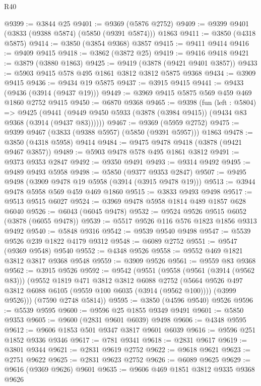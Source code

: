\begin{lexlean}{R40}
\begin{coremodule}
@9399 := @3844 @25
@9401 := @9369 (@5876 @2752)
@9409 := @9399 @9401 (@3833 (@9388 @5874) (@5850 (@9391 @5874))) @1863
@9411 := @3850 (@4318 @5875)
@9414 := @3850 (@3854 @9368) @3857
@9415 := @9411 @9414
@9416 := @9409 @9415
@9418 := @3862 (@3872 @25)
@9419 := @9416 @9418
@9421 := @3879 (@3880 @1863)
@9425 := @9419 (@3878 (@9421 @9401 @3857))
@9433 := @5903 @9415 @578 @495 @1861 @3812 @3812 @5875 @9368
@9434 := @3909 @9415
@9436 := @9434 @19 @5875
@9437 := @3915 @9415
@9441 := @9433 (@9436 (@3914 (@9437 @19)))
@9449 := @3969 @9415 @5875 @569 @459 @469 @1860 @2752 @9415
@9450 := @6870 @9368
@9465 := @9398
    (fun (left : @5804) =>
    @9425 (@9441 (@9449 @9450 @5933 (@3878 (@3984 @9415)) (@9434 @83 @9368 (@3914 (@9437 @83))))))
@9467 := @9369 (@5959 @2752)
@9475 := @9399 @9467 (@3833 (@9388 @5957) (@5850 (@9391 @5957))) @1863
@9478 := @3850 (@4318 @5958) @9414
@9484 := @9475 @9478 @9418 (@3878 (@9421 @9467 @3857))
@9489 := @5903 @9478 @578 @495 @1861 @3812
@9491 := @9373 @9353 @2847
@9492 := @9350 @9491
@9493 := @9314 @9492
@9495 := @9489 @9493 @5958
@9498 := @5850 (@9377 @9353 @2847)
@9507 := @9495 @9498 (@3909 @9478 @19 @5958 (@3914 (@3915 @9478 @19)))
@9513 := @3944 @9478 @5958 @569 @459 @469 @1860
@9515 := @3833 @9493 @9498
@9517 := @9513 @9515 @6027
@9524 := @3969 @9478 @5958 @1814 @489 @1857 @628 @6040
@9526 := @6043 (@6045 @9478)
@9532 := @9524 @9526 @9515 @6052 (@3878 (@6055 @9478))
@9539 := @5517 @9526 @116 @576 @1823 @1856 @9313 @9492
@9540 := @5848 @9316
@9542 := @9539 @9540 @9498
@9547 := @5539 @9526 @239 @1822 @4179 @9312
@9548 := @6089 @2752
@9551 := @9547 (@9369 @9548) @9540
@9552 := @4348 @9526
@9558 := @9552 @469 @1821 @3812 @3817 @9368 @9548
@9559 := @3909 @9526
@9561 := @9559 @83 @9368
@9562 := @3915 @9526
@9592 := @9542
    (@9551
      (@9558
        (@9561 (@3914 (@9562 @83)))
        (@9552
          @1819
          @471
          @3812
          @3812
          @6088
          @2752
          (@5664 @9526 @497 @3812 @6088 @6105 (@9559 @100 @6035 (@3914 (@9562 @100))))
          (@3999 @9526)))
      (@7590 @2748 @5814))
@9595 := @3850 (@4596 @9540) @9526
@9596 := @5539 @9595
@9600 := @9596 @25 @1855 @9349 @9491
@9601 := @5850 @9353
@9605 := @9600 (@2831 @9601 @6039) @9498
@9606 := @4348 @9595
@9612 := @9606 @1853 @501 @9347 @3817 @9601 @6039
@9616 := @9596 @251 @1852 @9336 @9346
@9617 := @781 @9341
@9618 := @2831 @9617
@9619 := @3801 @9344
@9621 := @2831 @9619 @2752
@9622 := @9618 @9621
@9623 := @2751 @9622
@9625 := @2831 @9623 @2752
@9626 := @6089 @9625
@9629 := @9616 (@9369 @9626) @9601
@9635 := @9606 @469 @1851 @3812 @9335 @9368 @9626

\end{coremodule}
\end{lexlean}
